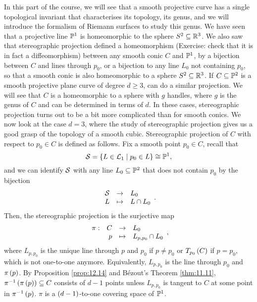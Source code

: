 In this part of the course, we will see that a smooth projective curve has a single topological invariant that characterises its topology, its genus, and we will introduce the formalism of Riemann surfaces to study this genus. We have seen that a projective line $ \P^1 $ is homeomorphic to the sphere $ S^2 \subseteq \R^3 $. We also saw that stereographic projection defined a homeomorphism (Exercise: check that it is in fact a diffeomorphism) between any smooth conic $ C $ and $ \P^1 $, by a bijection between $ C $ and lines through $ p_0 $, or a bijection to any line $ L_0 $ not containing $ p_0 $, so that a smooth conic is also homeomorphic to a sphere $ S^2 \subseteq \R^3 $. If $ C \subseteq \P^2 $ is a smooth projective plane curve of degree $ d \ge 3 $, can do a similar projection. We will see that $ C $ is a homeomorphic to a sphere with $ g $ handles, where $ g $ is the genus of $ C $ and can be determined in terms of $ d $. In these cases, stereographic projection turns out to be a bit more complicated than for smooth conics. We now look at the case $ d = 3 $, where the study of stereographic projection gives us a good grasp of the topology of a smooth cubic. Stereographic projection of $ C $ with respect to $ p_0 \in C $ is defined as follows. Fix a smooth point $ p_0 \in C $, recall that
$$ \SS = \cb{L \in \LL_1 \mid p_0 \in L} \cong \P^1, $$
and we can identify $ \SS $ with any line $ L_0 \subseteq \P^2 $ that does not contain $ p_0 $ by the bijection
$$ \function{\SS}{L_0}{L}{L \cap L_0}. $$
Then, the stereographic projection is the surjective map
$$ \function[\pi]{C}{L_0}{p}{L_{p, p_0} \cap L_0}, $$
where $ L_{p, p_0} $ is the unique line through $ p $ and $ p_0 $ if $ p \ne p_0 $ or $ T_{p_0}\rb{C} $ if $ p = p_0 $, which is not one-to-one anymore. Equivalently, $ L_{p, p_0} $ is the line through $ p_0 $ and $ \pi\rb{p} $. By Proposition \ref{prop:12.14} and B\'ezout's Theorem \ref{thm:11.11}, $ \pi^{-1}\rb{\pi\rb{p}} \subseteq C $ consists of $ d - 1 $ points unless $ L_{p, p_0} $ is tangent to $ C $ at some point in $ \pi^{-1}\rb{p} $. $ \pi $ is a $ \rb{d - 1} $-to-one covering space of $ \P^1 $.


